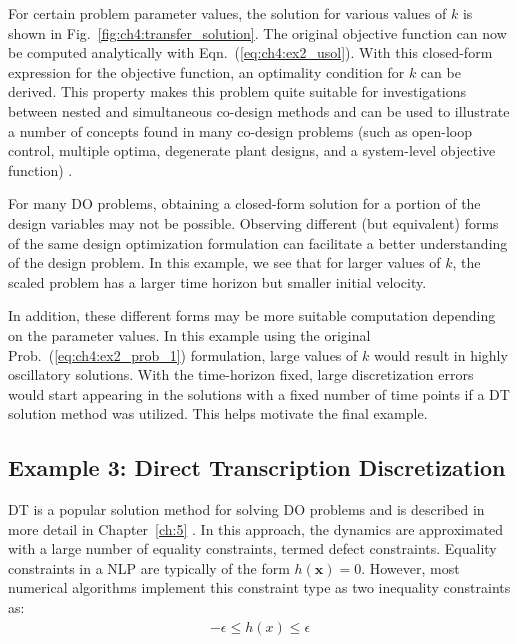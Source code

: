 \noindent For certain problem parameter values, the solution for various values of $k$ is shown in Fig.~\ref{fig:ch4:transfer_solution}. 
The original objective function can now be computed analytically with Eqn.~(\ref{eq:ch4:ex2_usol}).
With this closed-form expression for the objective function, an optimality condition for $k$ can be derived.
This property makes this problem quite suitable for investigations between nested and simultaneous co-design methods and can be used to illustrate a number of concepts found in many co-design problems (such as open-loop control, multiple optima, degenerate plant designs, and a system-level objective function) \cite{Herber2017b}.

For many DO problems, obtaining a closed-form solution for a portion of the design variables may not be possible. 
Observing different (but equivalent) forms of the same design optimization formulation can facilitate a better understanding of the design problem.
In this example, we see that for larger values of $k$, the scaled problem has a larger time horizon but smaller initial velocity. 

In addition, these different forms may be more suitable computation depending on the parameter values.
In this example using the original Prob.~(\ref{eq:ch4:ex2_prob_1}) formulation, large values of $k$ would result in highly oscillatory solutions.
With the time-horizon fixed, large discretization errors would start appearing in the solutions with a fixed number of time points if a DT solution method was utilized. This helps motivate the final example.

\subsection{Example 3: Direct Transcription Discretization \label{sec:example3}}

DT is a popular solution method for solving DO problems and is described in more detail in Chapter~\ref{ch:5} \cite{Biegler2010a, Betts2010a, Allison2014b,Allison2014a}.
In this approach, the dynamics are approximated with a large number of equality constraints, termed defect constraints.
Equality constraints in a NLP are typically of the form $h(\bm{x}) = 0$. However, most numerical algorithms implement this constraint type as two inequality constraints as:
\begin{align}
\label{eq:ch4:ineq_error}
- \epsilon \leq h(x) \leq \epsilon
\end{align}

